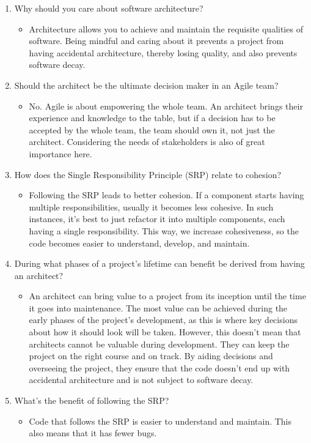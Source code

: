 

\begin{enumerate}
\item 
Why should you care about software architecture?

\begin{itemize}
\item 
Architecture allows you to achieve and maintain the requisite qualities of software. Being mindful and caring about it prevents a project from having accidental architecture, thereby losing quality, and also prevents software decay.
\end{itemize}

\item 
Should the architect be the ultimate decision maker in an Agile team?
\begin{itemize}
\item 
No. Agile is about empowering the whole team. An architect brings their experience and knowledge to the table, but if a decision has to be accepted by the whole team, the team should own it, not just the architect. Considering the needs of stakeholders is also of great importance here.
\end{itemize}

\item 
How does the Single Responsibility Principle (SRP) relate to cohesion?

\begin{itemize}
\item 
Following the SRP leads to better cohesion. If a component starts having multiple responsibilities, usually it becomes less cohesive. In such instances, it's best to just refactor it into multiple components, each having a single responsibility. This way, we increase cohesiveness, so the code becomes easier to understand, develop, and maintain.
\end{itemize}

\item
During what phases of a project's lifetime can benefit be derived from having an architect?

\begin{itemize}
\item 
An architect can bring value to a project from its inception until the time it goes into maintenance. The most value can be achieved during the early phases of the project's development, as this is where key decisions about how it should look will be taken. However, this doesn't mean that architects cannot be valuable during development. They can keep the project on the right course and on track. By aiding decisions and overseeing the project, they ensure that the code doesn't end up with accidental architecture and is not subject to software decay.
\end{itemize}

\item
What's the benefit of following the SRP?

\begin{itemize}
\item 
Code that follows the SRP is easier to understand and maintain. This also means that it has fewer bugs.
\end{itemize}

\end{enumerate}